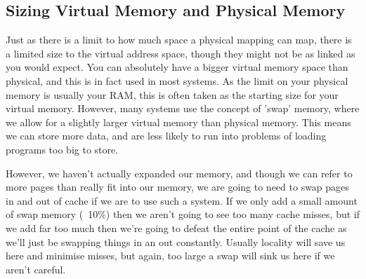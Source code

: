 \subsection{Sizing Virtual Memory and Physical Memory}

Just as there is a limit to how much space a physical mapping can map, there is a limited size to the virtual address space, though they might not be as linked as you would expect. You can absolutely have a bigger virtual memory space than physical, and this is in fact used in most systems. As the limit on your physical memory is usually your RAM, this is often taken as the starting size for your virtual memory. However, many systems use the concept of 'swap' memory, where we allow for a slightly larger virtual memory than physical memory. This means we can store more data, and are less likely to run into problems of loading programs too big to store.

However, we haven't actually expanded our memory, and though we can refer to more pages than really fit into our memory, we are going to need to swap pages in and out of cache if we are to use such a system. If we only add a small amount of swap memory (~10\%) then we aren't going to see too many cache misses, but if we add far too much then we're going to defeat the entire point of the cache as we'll just be swapping things in an out constantly. Usually locality will save us here and minimise misses, but again, too large a swap will sink us here if we aren't careful.



